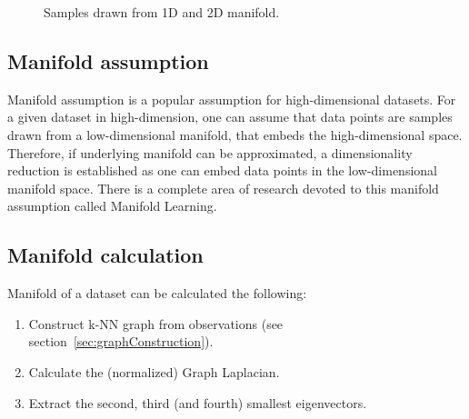 \begin{figure}[H]
    \centering
    \caption{Samples drawn from 1D and 2D manifold.}
\end{figure}


\subsection{Manifold assumption}
\label{sec:manifoldAssumption}
Manifold assumption is a popular assumption for high-dimensional datasets.
For a given dataset in high-dimension, one can assume that data points are samples drawn from a low-dimensional manifold,
that embeds the high-dimensional space. 
Therefore, if underlying manifold can be approximated, a dimensionality reduction
is established as one can embed data points in the low-dimensional manifold space.
There is a complete area of research devoted to this manifold assumption called Manifold Learning\cite{ManifoldLearning}.

\subsection{Manifold calculation}
\label{sec:manifold_calculation}
Manifold of a dataset can be calculated the following:

\begin{enumerate}
    \item Construct k-NN graph from observations (see section~\ref{sec:graphConstruction}).
    \item Calculate the (normalized) Graph Laplacian.
    \item Extract the second, third (and fourth) smallest eigenvectors.
\end{enumerate}



